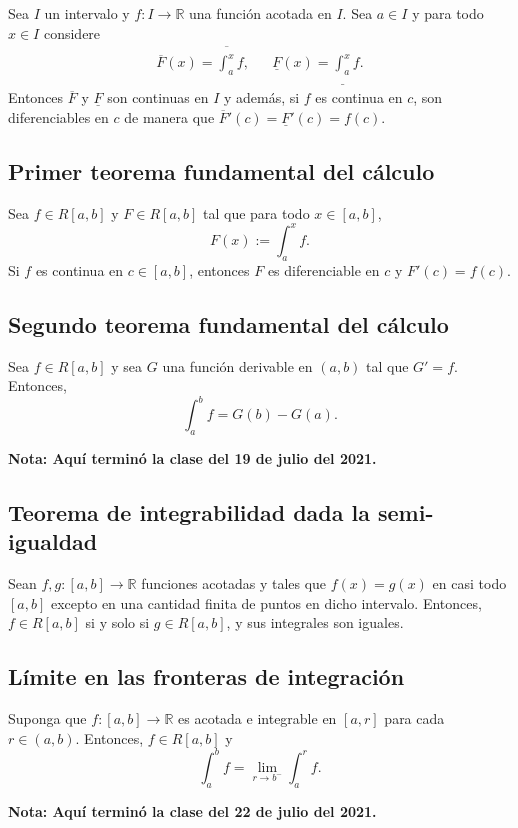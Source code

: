 \documentclass{article}
\begin{document}
Sea $I$ un intervalo y $f:I\to\mathbb{R}$ una función acotada en $I$. Sea $a\in I$ y para todo $x\in I$ considere
\begin{align*}
\overline{F}(x)= \overline{\int_a^x} f, && \underline{F}(x)= \underline{\int_a^x} f.
\end{align*}
Entonces $\overline{F}$ y $\underline{F}$ son continuas en $I$ y además, si $f$ es continua en $c$, son diferenciables en $c$ de manera que $\overline{F}'(c)=\underline{F}'(c)=f(c)$.

\subsection*{Primer teorema fundamental del cálculo}

Sea $f\in R[a,b]$ y $F\in R[a,b]$ tal que para todo $x\in[a,b]$,
$$F(x):=\int_a^x f.$$
Si $f$ es continua en $c\in[a,b]$, entonces $F$ es diferenciable en $c$ y $F'(c)=f(c)$.

\subsection*{Segundo teorema fundamental del cálculo}

Sea $f\in R[a,b]$ y sea $G$ una función derivable en $(a,b)$ tal que $G'=f$. Entonces,
$$\int_a^b f=G(b)-G(a).$$

\vspace{10pt}
\textbf{Nota: Aquí terminó la clase del 19 de julio del 2021.}
\newpage

\subsection*{Teorema de integrabilidad dada la semi-igualdad}

Sean $f,g:[a,b]\to\mathbb{R}$ funciones acotadas y tales que $f(x)=g(x)$ en casi todo $[a,b]$ excepto en una cantidad finita de puntos en dicho intervalo. Entonces, $f\in R[a,b]$ si y solo si $g\in R[a,b]$, y sus integrales son iguales.

\subsection*{Límite en las fronteras de integración}

Suponga que $f:[a,b]\to\mathbb{R}$ es acotada e integrable en $[a,r]$ para cada $r\in(a,b)$. Entonces, $f\in R[a,b]$ y
$$\int_a^b f=\lim_{r\to b^{-}} \int_a^r f.$$

\vspace{10pt}
\textbf{Nota: Aquí terminó la clase del 22 de julio del 2021.}
\end{document}
